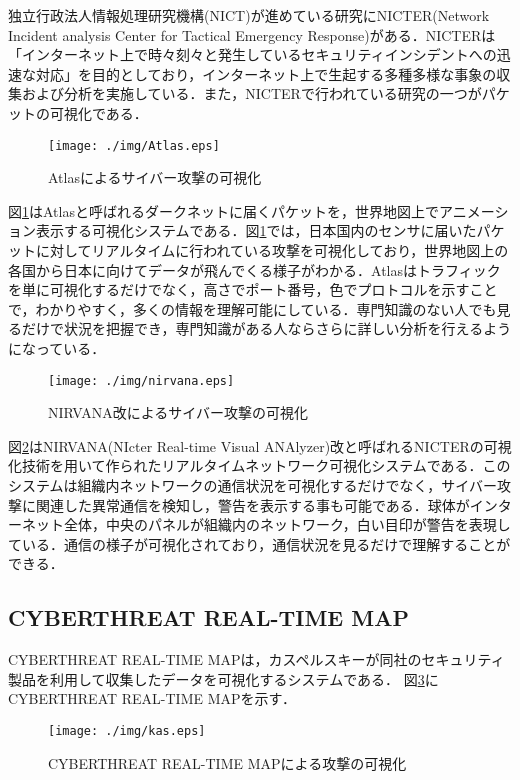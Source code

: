 \documentclass{thesis}
\begin{document}
独立行政法人情報処理研究機構(NICT)が進めている研究にNICTER(Network Incident analysis Center for Tactical Emergency Response)\cite{NICTER}がある．NICTERは「インターネット上で時々刻々と発生しているセキュリティインシデントへの迅速な対応」を目的としており，インターネット上で生起する多種多様な事象の収集および分析を実施している．また，NICTERで行われている研究の一つがパケットの可視化である．

\begin{figure}[H]
 \center
 \texttt{[image: ./img/Atlas.eps]}
 \caption{Atlasによるサイバー攻撃の可視化}
 \label{fig:Atlas}
\end{figure}

図\ref{fig:Atlas}はAtlas\cite{atlas}と呼ばれるダークネットに届くパケットを，世界地図上でアニメーション表示する可視化システムである．図\ref{fig:Atlas}では，日本国内のセンサに届いたパケットに対してリアルタイムに行われている攻撃を可視化しており，世界地図上の各国から日本に向けてデータが飛んでくる様子がわかる．Atlasはトラフィックを単に可視化するだけでなく，高さでポート番号，色でプロトコルを示すことで，わかりやすく，多くの情報を理解可能にしている．専門知識のない人でも見るだけで状況を把握でき，専門知識がある人ならさらに詳しい分析を行えるようになっている．

\begin{figure}[H]
 \center
 \texttt{[image: ./img/nirvana.eps]}
 \caption{NIRVANA改によるサイバー攻撃の可視化}
 \label{fig:nirvana}
\end{figure}

図\ref{fig:nirvana}はNIRVANA(NIcter Real-time Visual ANAlyzer)改と呼ばれるNICTERの可視化技術を用いて作られたリアルタイムネットワーク可視化システムである．このシステムは組織内ネットワークの通信状況を可視化するだけでなく，サイバー攻撃に関連した異常通信を検知し，警告を表示する事も可能である．球体がインターネット全体，中央のパネルが組織内のネットワーク，白い目印が警告を表現している．通信の様子が可視化されており，通信状況を見るだけで理解することができる．


\subsection*{CYBERTHREAT REAL-TIME MAP} \label{sec:MAP}

CYBERTHREAT REAL-TIME MAP\cite{kas}は，カスペルスキーが同社のセキュリティ製品を利用して収集したデータを可視化するシステムである．
図\ref{fig:kas}にCYBERTHREAT REAL-TIME MAPを示す．

\begin{figure}[H]
 \center
 \texttt{[image: ./img/kas.eps]}
 \caption{CYBERTHREAT REAL-TIME MAPによる攻撃の可視化}
 \label{fig:kas}
\end{figure}
\end{document}
